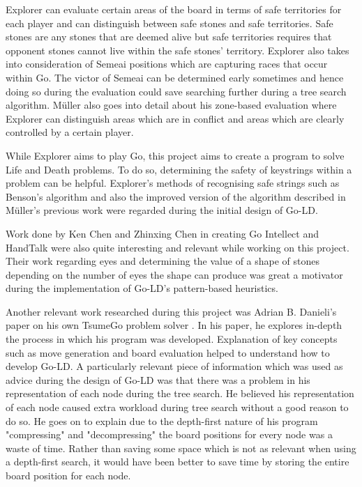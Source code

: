 \documentclass{l4proj}
\begin{document}
Explorer can evaluate certain areas of the board in terms of safe territories for each player and can distinguish between safe stones and safe territories. Safe stones are any stones that are deemed alive but safe territories requires that opponent stones cannot live within the safe stones' territory. Explorer also takes into consideration of Semeai positions which are capturing races that occur within Go. The victor of Semeai can be determined early sometimes and hence doing so during the evaluation could save searching further during a tree search algorithm. Müller also goes into detail about his zone-based evaluation where Explorer can distinguish areas which are in conflict and areas which are clearly controlled by a certain player.

While Explorer aims to play Go, this project aims to create a program to solve Life and Death problems. To do so, determining the safety of keystrings within a problem can be helpful. Explorer's methods of recognising safe strings such as Benson's algorithm \citep{Benson1976} and also the improved version of the algorithm described in Müller's previous work \citep{Muller1998} were regarded during the initial design of Go-LD.

Work done by Ken Chen and Zhinxing Chen \citep{Chen1999} in creating Go Intellect and HandTalk were also quite interesting and relevant while working on this project. Their work regarding eyes and determining the value of a shape of stones depending on the number of eyes the shape can produce was great a motivator during the implementation of Go-LD's pattern-based heuristics.

Another relevant work researched during this project was Adrian B. Danieli's paper on his own TsumeGo problem solver \citep{Adrian2010}. In his paper, he explores in-depth the process in which his program was developed. Explanation of key concepts such as move generation and board evaluation helped to understand how to develop Go-LD. A particularly relevant piece of information which was used as advice during the design of Go-LD was that there was a problem in his representation of each node during the tree search. He believed his representation of each node caused extra workload during tree search without a good reason to do so. He goes on to explain due to the depth-first nature of his program "compressing" and "decompressing" the board positions for every node was a waste of time. Rather than saving some space which is not as relevant when using a depth-first search, it would have been better to save time by storing the entire board position for each node.
\end{document}
